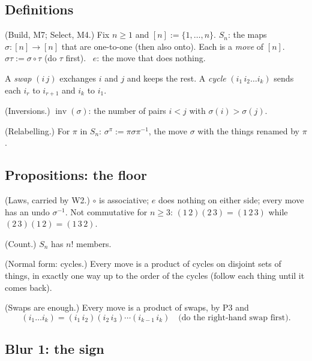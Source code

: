\subsection*{Definitions}

\begin{lines}
\item[\lab{D1}] (Build, M7; Select, M4.) Fix $n \ge 1$ and $[n] := \{1, \dots, n\}$. $S_n$: the maps $\sigma : [n] \to [n]$ that are one-to-one (then also onto). Each is a \emph{move} of $[n]$. \ $\sigma \tau := \sigma \circ \tau$ (do $\tau$ first). \ $e$: the move that does nothing.
\item[\lab{D2}] A \emph{swap} $(i\,j)$ exchanges $i$ and $j$ and keeps the rest. A \emph{cycle} $(i_1\, i_2 \dots i_k)$ sends each $i_r$ to $i_{r+1}$ and $i_k$ to $i_1$.
\item[\lab{D3}] (Inversions.) $\operatorname{inv}(\sigma)$: the number of pairs $i < j$ with $\sigma(i) > \sigma(j)$.
\item[\lab{D4}] (Relabelling.) For $\pi$ in $S_n$: $\sigma^\pi := \pi \sigma \pi^{-1}$, the move $\sigma$ with the things renamed by $\pi$.
\end{lines}

\subsection*{Propositions: the floor}

\begin{lines}
\item[\lab{P1}] (Laws, carried by W2.) $\circ$ is associative; $e$ does nothing on either side; every move has an undo $\sigma^{-1}$. Not commutative for $n \ge 3$: $(1\,2)(2\,3) = (1\,2\,3)$ while $(2\,3)(1\,2) = (1\,3\,2)$.
\item[\lab{P2}] (Count.) $S_n$ has $n!$ members.
\item[\lab{P3}] (Normal form: cycles.) Every move is a product of cycles on disjoint sets of things, in exactly one way up to the order of the cycles (follow each thing until it comes back).
\item[\lab{P4}] (Swaps are enough.) Every move is a product of swaps, by P3 and \[ (i_1 \dots i_k) = (i_1\, i_2)(i_2\, i_3) \cdots (i_{k-1}\, i_k) \quad \text{(do the right-hand swap first).} \]
\end{lines}

\subsection*{Blur 1: the sign}

